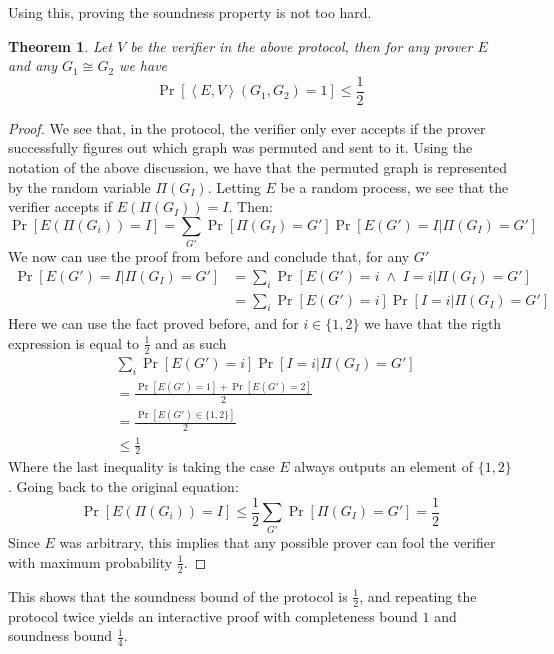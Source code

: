 \documentclass{article}
\newtheorem{theorem}{Theorem}
\begin{document}
Using this, proving the soundness property is not too hard. 
\begin{theorem}
    Let $V$ be the verifier in the above protocol, then for any  prover $E$ and any $G_1  \cong G_2$ we have \[ \Pr[\left<E, V\right>(G_1, G_2) = 1] \leq \frac{1}{2} \] 
\end{theorem}
\begin{proof}
    We see that, in the protocol, the verifier only ever accepts if the prover successfully figures out which graph was permuted and sent to it. Using the notation of the above discussion, we have that the permuted graph is represented by the random variable $\Pi(G_I)$. Letting $E$ be a random process, we see that the verifier accepts if $E(\Pi(G_I)) = I$. Then:
    \[ \Pr[E(\Pi(G_i)) = I] = \sum_{G'} \Pr[\Pi(G_I) = G'] \Pr[E(G') = I | \Pi(G_I) = G'] \]
    We now can use the proof from before and conclude that, for any $G'$
    \begin{align*}
    \Pr[E(G') = I | \Pi(G_I) = G'] &= \sum_i \Pr[E(G') = i \; \land \; I = i | \Pi(G_I) = G' ] \\
    &= \sum_i \Pr[E(G') = i ] \Pr[ I = i | \Pi(G_I) = G' ] 
    \end{align*}
    Here we can use the fact proved before, and for $i \in \{1, 2\}$ we have that the rigth expression is equal to $\frac{1}{2}$ and as such
    \begin{align*}
         &\sum_i \Pr[E(G') = i ] \Pr[ I = i | \Pi(G_I) = G' ] \\
         &= \frac{\Pr[E(G') = 1 ] + \Pr[E(G') = 2]}{2} \\
         &= \frac{\Pr[E(G') \in \{ 1, 2\}]}{2} \\
         &\leq \frac{1}{2}
    \end{align*}
    Where the last inequality is taking the case $E$ always outputs an element of $ \{ 1, 2\}$. Going back to the original equation:
    \[\Pr[E(\Pi(G_i)) = I] \leq \frac{1}{2} \sum_{G'} \Pr[\Pi(G_I) = G'] = \frac{1}{2} \]
    Since $E$ was arbitrary, this implies that any possible prover can fool the verifier with maximum probability $\frac{1}{2}$.
\end{proof}

This shows that the soundness bound of the protocol is $\frac{1}{2}$, and repeating the protocol twice yields an interactive proof with completeness bound $1$ and soundness bound $\frac{1}{4}$. 
\end{document}
